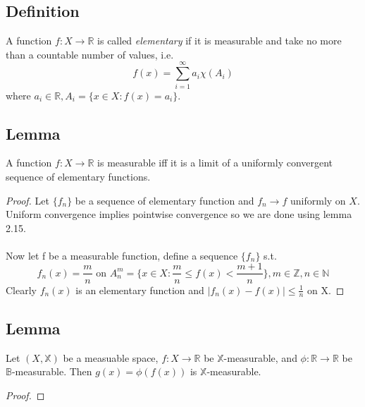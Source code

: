 \documentclass[a4paper, 12pt, twoside]{article}
\begin{document}
\subsection{Definition}
A function $f:X \to  \mathbb{R}$ is called \emph{elementary} if it is measurable and take no more than a countable number of values, i.e.
$$f(x)=\sum_{i=1}^{\infty}a_{i}\chi(A_{i}) $$
where $a_{i}\in \mathbb{R}, A_{i}=\{x\in X: f(x)=a_{i}\}$.
\subsection{Lemma}
A function $f:X \to  \mathbb{R}$ is measurable iff it is a limit of a uniformly convergent sequence of elementary functions.
\begin{proof}
    Let $\{f_{n}\}$ be a sequence of elementary function and $f_{n}\to f$ uniformly on $X$. Uniform convergence implies pointwise convergence so we are done using lemma 2.15.\\\\
    Now let f be a measurable function, define a sequence $\{f_{n}\}$ s.t.
    $$f_{n}(x)=\frac{m}{n} \text{ on } A_{n}^{m}=\{x\in X: \frac{m}{n}\leq f(x)< \frac{m+1}{n}\},m\in \mathbb{Z}, n\in \mathbb{N} $$
    Clearly $f_{n}(x)$ is an elementary function and $|f_{n}(x)-f(x)|\leq \frac{1}{n}$ on X.
\end{proof}
\subsection{Lemma}
Let $(X,\mathbb{X})$ be a measuable space, $f:X \to  \mathbb{R}$ be $\mathbb{X}$-measurable, and $\phi:\mathbb{R} \to  \mathbb{R}$ be $\mathbb{B}$-measurable. Then $g(x)=\phi(f(x))$ is $\mathbb{X}$-measurable.
\begin{proof}
    
\end{proof}
\end{document}
